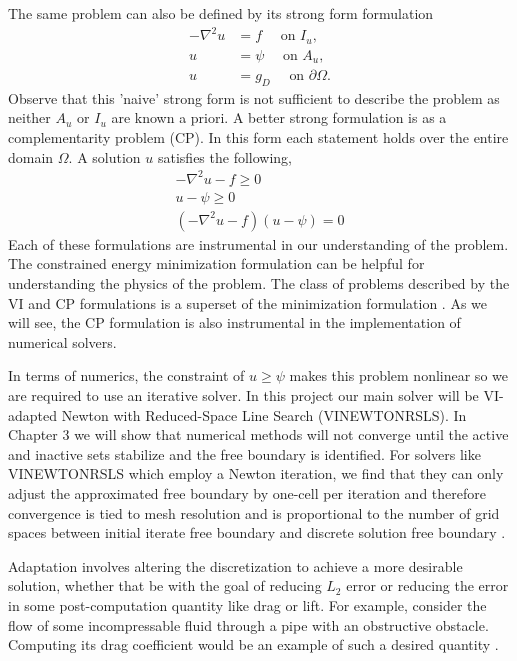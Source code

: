 \documentclass[12 pt]{report}
\begin{document}
The same problem can also be defined by its strong form formulation
\begin{align}
  -\nabla^2 u &= f \quad \text{ on } I_u,\\
  u &= \psi \quad \text{ on } A_u,\\
  u &= g_D \quad \text{ on } \partial \Omega.
\end{align}
 Observe that this 'naive' strong form is not sufficient to describe the problem as neither $A_u$ or $I_u$ are known a priori. A better strong formulation is as a complementarity problem (CP). In this form each statement holds over the entire domain $\Omega$. A solution $u$ satisfies the following, 
\begin{align}
  -\nabla^2 u - f \geq 0\\
  u - \psi \geq 0\\
  (-\nabla^2u - f)(u - \psi) = 0
\end{align}
Each of these formulations are instrumental in our understanding of the problem. The constrained energy minimization formulation can be helpful for understanding the physics of the problem. The class of problems described by the VI and CP formulations is a superset of the minimization formulation \citep[page 319]{bueler_petsc_2021}. As we will see, the CP formulation is also instrumental in the implementation of numerical solvers.

In terms of numerics, the constraint of $u \geq \psi$ makes this problem nonlinear so we are required to use an iterative solver. In this project our main solver will be VI-adapted Newton with Reduced-Space Line Search (VINEWTONRSLS). In Chapter 3 we will show that numerical methods will not converge until the active and inactive sets stabilize and the free boundary is identified. For solvers like VINEWTONRSLS which employ a Newton iteration, we find that they can only adjust the approximated free boundary by one-cell per iteration \citep{graser_multigrid_2009} and therefore convergence is tied to mesh resolution and is proportional to the number of grid spaces between initial iterate free boundary and discrete solution free boundary \citep[page 324]{bueler_petsc_2021}. 




Adaptation involves altering the discretization to achieve a more desirable solution, whether that be with the goal of reducing $L_2$ error or reducing the error in some post-computation quantity like drag or lift. For example, consider the flow of some incompressable fluid through a pipe with an obstructive obstacle. Computing its drag coefficient would be an example of such a desired quantity \citep[Chapter 1.1]{bangerth_adaptive_2003}.
\end{document}
